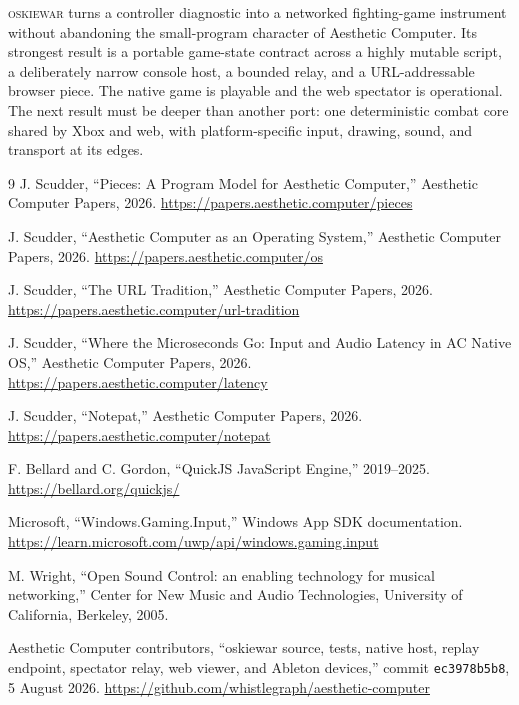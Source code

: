 \documentclass[10pt,letterpaper,twocolumn]{article}
\newcommand{\game}{\textsc{oskiewar}}
\newcommand{\code}[1]{\texttt{#1}}
\begin{document}
\game{} turns a controller diagnostic into a networked fighting-game instrument without abandoning the small-program character of Aesthetic Computer. Its strongest result is a portable game-state contract across a highly mutable script, a deliberately narrow console host, a bounded relay, and a URL-addressable browser piece. The native game is playable and the web spectator is operational. The next result must be deeper than another port: one deterministic combat core shared by Xbox and web, with platform-specific input, drawing, sound, and transport at its edges.

\begin{thebibliography}{9}
J. Scudder, ``Pieces: A Program Model for Aesthetic Computer,'' Aesthetic Computer Papers, 2026. \url{https://papers.aesthetic.computer/pieces}

J. Scudder, ``Aesthetic Computer as an Operating System,'' Aesthetic Computer Papers, 2026. \url{https://papers.aesthetic.computer/os}

J. Scudder, ``The URL Tradition,'' Aesthetic Computer Papers, 2026. \url{https://papers.aesthetic.computer/url-tradition}

J. Scudder, ``Where the Microseconds Go: Input and Audio Latency in AC Native OS,'' Aesthetic Computer Papers, 2026. \url{https://papers.aesthetic.computer/latency}

\newpage
{}
J. Scudder, ``Notepat,'' Aesthetic Computer Papers, 2026. \url{https://papers.aesthetic.computer/notepat}

F. Bellard and C. Gordon, ``QuickJS JavaScript Engine,'' 2019--2025. \url{https://bellard.org/quickjs/}

Microsoft, ``Windows.Gaming.Input,'' Windows App SDK documentation. \url{https://learn.microsoft.com/uwp/api/windows.gaming.input}

M. Wright, ``Open Sound Control: an enabling technology for musical networking,'' Center for New Music and Audio Technologies, University of California, Berkeley, 2005.

Aesthetic Computer contributors, ``oskiewar source, tests, native host, replay endpoint, spectator relay, web viewer, and Ableton devices,'' commit \code{ec3978b5b8}, 5 August 2026. \url{https://github.com/whistlegraph/aesthetic-computer}
\end{thebibliography}
\end{document}
